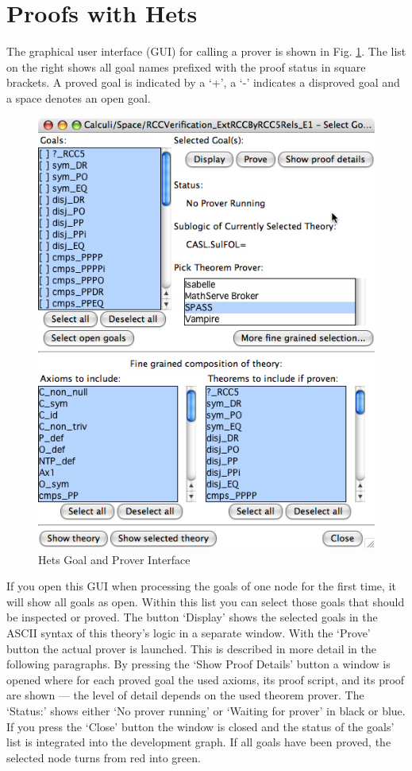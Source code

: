 \documentclass{article}
\begin{document}
\section{Proofs with Hets}\label{sec:Proofs}


The graphical user interface (GUI) for calling a prover
is shown in Fig. \ref{fig:proof_window}. The list on the right
shows all goal names prefixed with the proof status in square
brackets. A proved goal is indicated by a `+', a `-' indicates a
disproved goal and a space denotes an open goal.

\begin{figure}
\centering
\includegraphics[width=\textwidth]{proofmanagement1}
\caption{Hets Goal and Prover Interface\label{fig:proof_window}}
\end{figure}

If you open this GUI when processing the goals of one node for the first
time, it will show all goals as open. Within this list you can select
those goals that should be inspected or proved. The button `Display'
shows the selected goals in the ASCII syntax of this theory's logic in
a separate window. With the `Prove' button the actual prover is
launched. This is described in more detail in the following
paragraphs. By pressing the `Show Proof Details' button a window is
opened where for each proved goal the used axioms, its proof script,
and its proof are shown --- the level of detail depends on the used
theorem prover. The
`Status:' shows either `No prover running' or `Waiting for prover' in
black or blue. If you press the `Close' button the window is closed
and the status of the goals' list is integrated into the
development graph. If all goals have been proved, the selected node
turns from red into green. 
\end{document}
